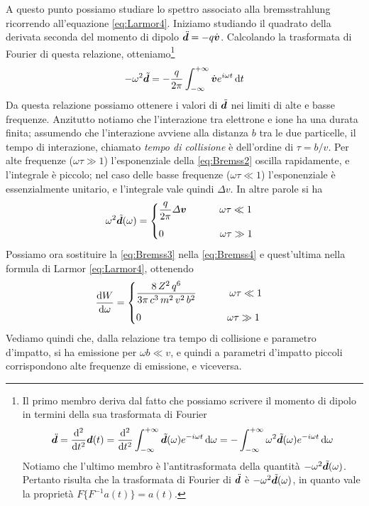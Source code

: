A questo punto possiamo studiare lo spettro associato alla bremsstrahlung ricorrendo all'equazione \ref{eq:Larmor4}. Iniziamo studiando il quadrato della derivata seconda del momento di dipolo $\V{\ddot{d}}= -q\V{\dot{v}}$. Calcolando la trasformata di Fourier di questa relazione, otteniamo\footnote{Il primo membro deriva dal fatto che possiamo scrivere il momento di dipolo in termini della sua trasformata di Fourier
\begin{align*}
\V{\ddot{d}} = \dern{}{t}{2} \V{d}(t) = \dern{}{t}{2} \int_{-\infty}^{+\infty} \V{\tilde{d}}(\omega) e^{-i\omega t} \, \dd \omega = -\int_{-\infty}^{+\infty} \omega^2\V{\tilde{d}}(\omega) e^{-i\omega t} \, \dd \omega 
\end{align*} 
Notiamo che l'ultimo membro è l'antitrasformata della quantità $-\omega^2\V{\tilde{d}}(\omega)$. Pertanto risulta che la trasformata di Fourier di $\V{\ddot{d}}$ è $-\omega^2\V{\tilde{d}}(\omega)$, in quanto vale la proprietà $F\{ F^{-1}a(t)\} = a(t)$.}
\begin{equation}
-\omega^2 \tilde{\V{d}} = - \dfrac{q}{2\pi} \int_{-\infty}^{+\infty} \V{\dot{v}} e^{i\omega t} \, \dd t \label{eq:Bremss2}
\end{equation} 
Da questa relazione possiamo ottenere i valori di $\tilde{\V{d}}$ nei limiti di alte e basse frequenze. Anzitutto notiamo che l'interazione tra elettrone e ione ha una durata finita; assumendo che l'interazione avviene alla distanza $b$ tra le due particelle, il tempo di interazione, chiamato \textit{tempo di collisione} è dell'ordine di $\tau=b/v$. Per alte frequenze ($\omega\tau\gg 1$) l'esponenziale della \ref{eq:Bremss2} oscilla rapidamente, e l'integrale è piccolo; nel caso delle basse frequenze ($\omega\tau\ll 1$) l'esponenziale è essenzialmente unitario, e l'integrale vale quindi $\Delta v$. In altre parole si ha
\begin{align}
\omega^2 \V{\tilde{d}}(\omega) = 
\begin{cases}
\dfrac{q}{2\pi} \Delta\V{v} \,\,\,\,\,\,\,\,\,\,\,\,\,\,\,\,\,\,\,\, \omega\tau \ll 1 \\[10pt]
0 \,\,\,\,\,\,\,\,\,\,\,\,\,\,\,\,\,\,\,\,\,\,\,\,\,\,\,\,\,\,\,\,\,\, \omega\tau \gg 1 
\end{cases} \label{eq:Bremss4}
\end{align}
Possiamo ora sostituire la \ref{eq:Bremss3} nella \ref{eq:Bremss4} e quest'ultima nella formula di Larmor \ref{eq:Larmor4}, ottenendo
\begin{align}
\dfrac{\mathrm{d} {W}}{\mathrm{d} {\omega}} = 
\begin{cases}
\dfrac{8\,Z^2 \,q^6}{3\pi \,c^3 \, m^2 \, v^2 \,b^2} \,\,\,\,\,\,\,\,\,\,\,\,\,\,\,\,\,\,\,\, \omega\tau \ll 1 \\[10pt]
0 \,\,\,\,\,\,\,\,\,\,\,\,\,\,\,\,\,\,\,\,\,\,\,\,\,\,\,\,\,\,\,\,\,\,\,\,\,\,\,\,\,\,\,\,\,\,\,\,\,\,\,\, \omega\tau \gg 1 
\end{cases} \label{eq:Bremss5}
\end{align}
Vediamo quindi che, dalla relazione tra tempo di collisione e parametro d'impatto, si ha emissione per $\omega b \ll v$, e quindi a parametri d'impatto piccoli corrispondono alte frequenze di emissione, e viceversa.

